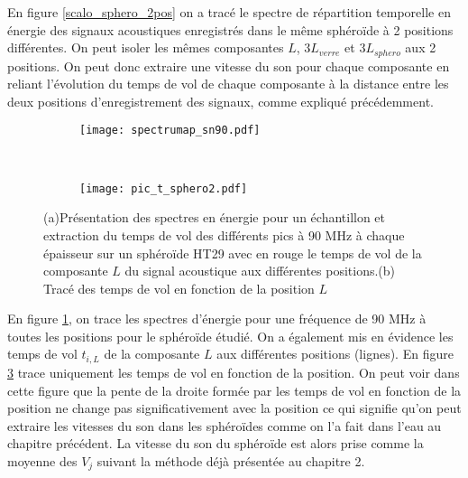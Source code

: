 En figure \ref{scalo_sphero_2pos} on a tracé le spectre de répartition temporelle en énergie des signaux acoustiques enregistrés dans le même sphéroïde à 2 positions différentes. On peut isoler les mêmes composantes $L$, $3L_{verre}$ et $3L_{sphero}$ aux 2 positions.  On peut donc extraire une vitesse du son pour chaque composante en reliant l'évolution du temps de vol de chaque composante  à la distance entre les deux positions d'enregistrement des signaux, comme expliqué précédemment. 
\begin{figure}[ht!]
\begin{subfigure}{0.5\textwidth}
\centering
\texttt{[image: spectrumap\_sn90.pdf]}
\caption{\label{pic_t_sphero}}
\end{subfigure}
~~
\begin{subfigure}{0.5\textwidth}
\texttt{[image: pic\_t\_sphero2.pdf]}
\caption{\label{pic_t_sphero2}}
\end{subfigure}
\caption{(a)Présentation des spectres en énergie  pour un échantillon et extraction du temps de vol des différents pics à 90 MHz à chaque épaisseur sur un sphéroïde HT29 avec  en rouge le temps de vol  de la composante  $L$ du signal acoustique aux différentes positions.(b) Tracé des temps de vol en fonction de la position $L$}
\end{figure}

En figure \ref{pic_t_sphero}, on trace les spectres d'énergie pour une fréquence de 90 MHz à toutes les positions pour le sphéroïde étudié. On a  également mis en évidence les temps de vol $t_{i,L}$ de la composante $L$ aux différentes positions (lignes). En figure \ref{pic_t_sphero2} trace uniquement les temps de vol en fonction de la position. On peut voir dans cette figure que la pente de la droite  formée par les temps de vol en fonction de la position ne change pas significativement avec la position ce qui  signifie qu'on peut  extraire les vitesses du son dans les sphéroïdes comme on l'a fait dans l'eau au chapitre précédent.  La vitesse du son du sphéroïde est alors prise comme la moyenne des $V_j$ suivant la méthode déjà présentée au chapitre 2. 

